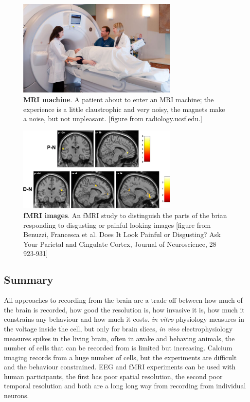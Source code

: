 \documentclass[12pt]{article}
\begin{document}
\begin{figure}
  \begin{center}
    \includegraphics[width=8cm]{mri.jpg}
    \end{center}
  \caption{\textbf{MRI machine}. A patient about to enter an MRI
    machine; the experience is a little claustrophic and very noisy,
    the magnets make a noise, but not unpleasant. [figure from
      radiology.ucsf.edu.]\label{fig:mri}}
\end{figure}



\begin{figure}
  \begin{center}
    \includegraphics[width=8cm]{fmri.jpg}
    \end{center}
  \caption{\textbf{fMRI images}. An fMRI study to distinguish the parts of the brian responding to disgusting or painful looking images [figure from Benuzzi, Francesca et al. Does It Look Painful or Disgusting? Ask Your Parietal and Cingulate Cortex, Journal of Neuroscience, 28 923-931]\label{fig:mri}}
\end{figure}

\subsection*{Summary}
All approaches to recording from the brain are a trade-off between how
much of the brain is recorded, how good the resolution is, how
invasive it is, how much it constrains any behaviour and how much it
costs. \textsl{in vitro} physiology measures in the voltage inside the
cell, but only for brain slices, \textsl{in vivo} electrophysiology
measures spikes in the living brain, often in awake and behaving
animals, the number of cells that can be recorded from is limited but
increasing. Calcium imaging records from a huge number of cells, but
the experiments are difficult and the behaviour constrained. EEG and
fMRI experiments can be used with human participants, the first has
poor spatial resolution, the second poor temporal resolution and both
are a long long way from recording from individual neurons.
\end{document}
